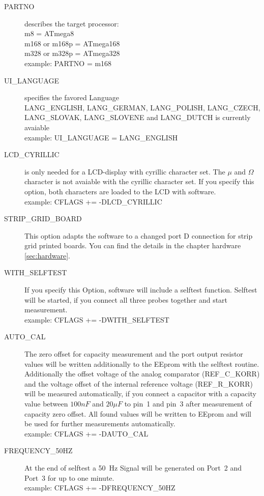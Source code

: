 \begin{description}
  \item[PARTNO] describes the target processor:\\
         m8 = ATmega8\\
         m168 or m168p = ATmega168\\
         m328 or m328p = ATmega328\\
    example:  PARTNO = m168
  \item[UI\_LANGUAGE] specifies the favored Language\\
    LANG\_ENGLISH, LANG\_GERMAN, LANG\_POLISH, LANG\_CZECH, LANG\_SLOVAK, LANG\_SLOVENE and LANG\_DUTCH is currently avaiable \\
    example:  UI\_LANGUAGE = LANG\_ENGLISH
  \item[LCD\_CYRILLIC] is only needed for a LCD-display with cyrillic character set. The \(\mu\) and \(\Omega\) character
is not avaiable with the cyrillic character set.
If you specify this option, both characters are loaded to the LCD with software.\\
example: CFLAGS += -DLCD\_CYRILLIC
  \item[STRIP\_GRID\_BOARD] This option adapts the software to a changed port D connection for strip grid printed boards.
You can find the details in the chapter hardware \ref{sec:hardware}.
  \item[WITH\_SELFTEST] If you specify this Option, software will include a selftest function.
Selftest will be started, if you connect all three probes together and start measurement.\\
example: CFLAGS += -DWITH\_SELFTEST
  \item[AUTO\_CAL] The zero offset for capacity measurement and the port output resistor values will be written additionally
to the EEprom with the selftest routine. Additionally the offset voltage of the analog comparator (REF\_C\_KORR) and the
voltage offset of the internal reference voltage (REF\_R\_KORR) will be measured automatically, if you connect a
capacitor with a capacity value between \(100 nF\) and \(20 \mu F\) to pin~1 and pin~3 after measurement of capacity zero offset. 
All found values will be written to EEprom and will be used for further measurements automatically.\\
example: CFLAGS += -DAUTO\_CAL
  \item[FREQUENCY\_50HZ] At the end of selftest a 50~Hz Signal will be generated on Port~2 and Port~3 for up to one minute.\\
example: CFLAGS += -DFREQUENCY\_50HZ

\end{description}
